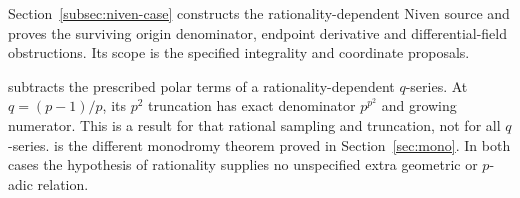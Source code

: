 Section~\ref{subsec:niven-case} constructs the rationality-dependent
Niven source  and proves the surviving origin denominator,
endpoint derivative and differential-field obstructions. Its scope is
the specified integrality and coordinate proposals.

 subtracts the prescribed polar terms of a rationality-dependent
$q$-series. At $q=(p-1)/p$, its $p^2$ truncation has exact denominator
$p^{p^2}$ and growing numerator. This is a result for that rational
sampling and truncation, not for all $q$-series.  is the different
monodromy theorem proved in Section~\ref{sec:mono}. In both cases the
hypothesis of rationality supplies no unspecified extra geometric or
$p$-adic relation.
